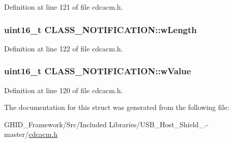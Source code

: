 \-Definition at line 121 of file cdcacm.\-h.

\hypertarget{struct_c_l_a_s_s___n_o_t_i_f_i_c_a_t_i_o_n_a7933669f6b6379d7ee0605f50422cbe2}{
\subsubsection[{w\-Length}]{\setlength{\rightskip}{0pt plus 5cm}uint16\-\_\-t {\bf \-C\-L\-A\-S\-S\-\_\-\-N\-O\-T\-I\-F\-I\-C\-A\-T\-I\-O\-N\-::w\-Length}}}\label{struct_c_l_a_s_s___n_o_t_i_f_i_c_a_t_i_o_n_a7933669f6b6379d7ee0605f50422cbe2}


\-Definition at line 122 of file cdcacm.\-h.

\hypertarget{struct_c_l_a_s_s___n_o_t_i_f_i_c_a_t_i_o_n_ab55dc65ad3f5b47da89beeaf7c03b4bc}{
\subsubsection[{w\-Value}]{\setlength{\rightskip}{0pt plus 5cm}uint16\-\_\-t {\bf \-C\-L\-A\-S\-S\-\_\-\-N\-O\-T\-I\-F\-I\-C\-A\-T\-I\-O\-N\-::w\-Value}}}\label{struct_c_l_a_s_s___n_o_t_i_f_i_c_a_t_i_o_n_ab55dc65ad3f5b47da89beeaf7c03b4bc}


\-Definition at line 120 of file cdcacm.\-h.



\-The documentation for this struct was generated from the following file\-:\begin{DoxyCompactItemize}
\item 
\-G\-H\-I\-D\-\_\-\-Framework/\-Src/\-Included Libraries/\-U\-S\-B\-\_\-\-Host\-\_\-\-Shield\-\_.-\/master/\hyperlink{cdcacm_8h}{cdcacm.\-h}\end{DoxyCompactItemize}
